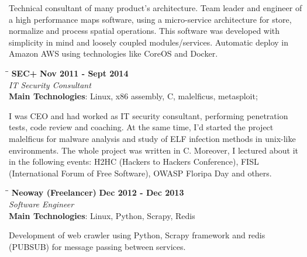 \documentclass[margin]{res}
\begin{document}
\begin{resume}
  Technical consultant of many product's architecture. Team leader and engineer of a high performance maps software, using a micro-service architecture for store, normalize and process spatial operations.
This software was developed with simplicity in mind and loosely
coupled modules/services. Automatic deploy in Amazon AWS using
technologies like CoreOS and Docker.


\vspace{-0.1in}

\vspace{-0.1in}
   \begin{tabbing}
   \hspace{2.3in}\= \hspace{1.7in}\= \kill %
    \textbf{SEC+}    \>\>\textbf{Nov 2011 - Sept 2014}\\
    \textit{IT Security Consultant}\\
    \textbf{Main Technologies}: Linux, x86 assembly, C, malelficus, metasploit;
   \end{tabbing}\vspace{-20pt}      %
    \vspace{2mm}
        I was CEO and had worked as IT security consultant, performing penetration tests, code review and coaching. At the same time, I’d started the project malelficus for malware analysis and study of ELF infection methods in unix-like environments. The whole project was written in C. Moreover, I lectured about it in the following events: H2HC (Hackers to Hackers Conference), FISL (International Forum of Free Software), OWASP Floripa Day and others.

\vspace{-0.1in}

   \begin{tabbing}
   \hspace{2.3in}\= \hspace{1.7in}\= \kill %
    \textbf{Neoway (Freelancer)}    \>\>\textbf{Dec 2012 - Dec 2013}\\
    \textit{Software Engineer}\\
    \textbf{Main Technologies}: Linux, Python, Scrapy, Redis
   \end{tabbing}\vspace{-20pt}      %
    \vspace{2mm}
 Development of web crawler using Python, Scrapy framework and redis (PUBSUB) for message passing between services.



\end{resume}
\end{document}
